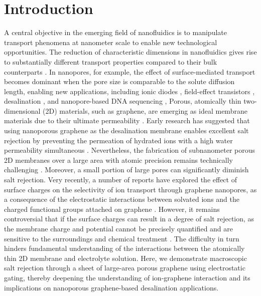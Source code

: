 \documentclass[journal=langd5,email=true, hyperref=true, keywords=false]{achemso}
\begin{document}
\section{Introduction}
\label{sec:intro}
A central objective in the emerging field of nanofluidics is to
manipulate transport phenomena at nanometer scale to enable new
technological opportunities. The reduction of characteristic
dimensions in nanofluidics gives rise to substantially different
transport properties compared to their bulk counterparts
\cite{Schoch_2008}. In nanopores, for example, the effect of
surface-mediated transport becomes dominant when the pore size is
comparable to the solute diffusion length, enabling new applications,
including ionic diodes \cite{Karnik_2007}, field-effect transistors
\cite{Nam_2009}, desalination \cite{Heiranian_2015}, and
nanopore-based DNA sequencing \cite{Heerema_2016,Garaj_2013}, Porous,
atomically thin two-dimensional (2D) materials, such as graphene, are
emerging as ideal membrane materials due to their ultimate
permeability
\cite{Suk_2010,Jiang_2009,Celebi_2014,Koenig_2012,Drahushuk_2012}. Early
research has suggested that using nanoporous graphene as the
desalination membrane enables excellent salt rejection by preventing
the permeation of hydrated ions with a high water permeability
simultaneous
\cite{Cohen_Tanugi_2012,Suk_2014,Cohen_Tanugi_2014,Cohen_Tanugi_2015,O_Hern_2015,Surwade_2015}. Nevertheless,
the fabrication of subnanometer porous 2D membranes over a large area
with atomic precision remains technically challenging
\cite{Suk_2014,Rollings_2016,O_Hern_2012,Wang_2017}. Moreover, a small
portion of large pores can significantly diminish salt rejection.
Very recently, a number of reports have explored the effect of surface
charges on the selectivity of ion transport through graphene
nanopores, as a consequence of the electrostatic interactions between
solvated ions and the charged functional groups attached on graphene
\cite{Rollings_2016,Surwade_2014}. However, it remains controversial
that if the surface charges can result in a degree of salt rejection,
as the membrane charge and potential cannot be precisely quantified
and are sensitive to the surroundings and chemical treatment
\cite{Li_2008}. The difficulty in turn hinders fundamental
understanding of the interactions between the atomically thin 2D
membrane and electrolyte solution. Here, we demonstrate macroscopic
salt rejection through a sheet of large-area porous graphene using
electrostatic gating, thereby deepening the understanding of
ion-graphene interaction and its implications on nanoporous
graphene-based desalination applications.
\end{document}
